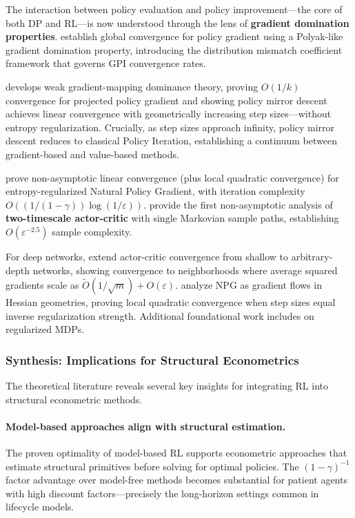 The interaction between policy evaluation and policy improvement---the core of both DP and RL---is now understood through the lens of \textbf{gradient domination properties}. \citet{agarwal2021theory} establish global convergence for policy gradient using a Polyak-like gradient domination property, introducing the distribution mismatch coefficient framework that governs GPI convergence rates.

\citet{xiao2022convergence} develops weak gradient-mapping dominance theory, proving $O(1/k)$ convergence for projected policy gradient and showing policy mirror descent achieves linear convergence with geometrically increasing step sizes---without entropy regularization. Crucially, as step sizes approach infinity, policy mirror descent reduces to classical Policy Iteration, establishing a continuum between gradient-based and value-based methods.

\citet{cen2022fast} prove non-asymptotic linear convergence (plus local quadratic convergence) for entropy-regularized Natural Policy Gradient, with iteration complexity $O((1/(1-\gamma))\log(1/\varepsilon))$. \citet{wu2020twotimescale} provide the first non-asymptotic analysis of \textbf{two-timescale actor-critic} with single Markovian sample paths, establishing $O(\varepsilon^{-2.5})$ sample complexity.

For deep networks, \citet{li2023actorcritic} extend actor-critic convergence from shallow to arbitrary-depth networks, showing convergence to neighborhoods where average squared gradients scale as $\tilde{O}(1/\sqrt{m}) + O(\varepsilon)$. \citet{muller2024npg} analyze NPG as gradient flows in Hessian geometries, proving local quadratic convergence when step sizes equal inverse regularization strength. Additional foundational work includes \citet{geist2019regularized} on regularized MDPs.

\subsubsection{Synthesis: Implications for Structural Econometrics}

The theoretical literature reveals several key insights for integrating RL into structural econometric methods.

\paragraph{Model-based approaches align with structural estimation.} The proven optimality of model-based RL \citep{zhang2024settling,li2024breaking} supports econometric approaches that estimate structural primitives before solving for optimal policies. The $(1-\gamma)^{-1}$ factor advantage over model-free methods becomes substantial for patient agents with high discount factors---precisely the long-horizon settings common in lifecycle models.


